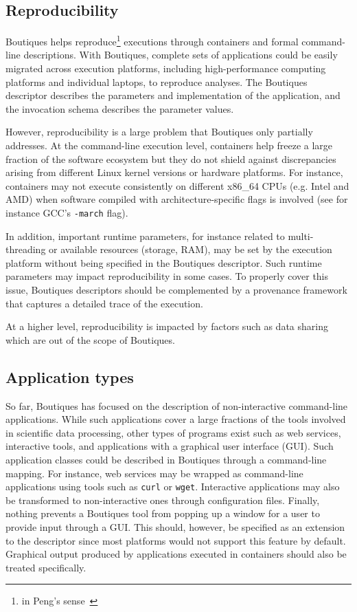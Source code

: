 \documentclass{article}
\newcommand{\boutiques}{Boutiques\xspace}
\begin{document}
\subsection{Reproducibility}

\boutiques helps reproduce\footnote{in Peng's
  sense~\cite{peng2011reproducible}} executions through containers and
formal command-line descriptions. With \boutiques, complete sets of
applications could be easily migrated across execution platforms,
including high-performance computing platforms and individual laptops,
to reproduce analyses. The \boutiques descriptor describes the
parameters and implementation of the application, and the invocation
schema describes the parameter values.

However, reproducibility is a large problem that \boutiques only
partially addresses. At the command-line execution level, containers
help freeze a large fraction of the software ecosystem but they do not
shield against discrepancies arising from different Linux kernel
versions or hardware platforms. For instance, containers may not
execute consistently on different x86\_64 CPUs (e.g. Intel and AMD)
when software compiled with architecture-specific flags is involved
(see for instance GCC's \texttt{-march} flag).

In addition, important runtime parameters, for instance related to
multi-threading or available resources (storage, RAM), may be set by
the execution platform without being specified in the \boutiques
descriptor. Such runtime parameters may impact reproducibility in some
cases. To properly cover this issue, \boutiques descriptors should be
complemented by a provenance framework that captures a detailed trace
of the execution.

At a higher level, reproducibility is impacted by factors
such as data sharing~\cite{poldrack2014making} which are out of the
scope of \boutiques.

\subsection{Application types}

So far, \boutiques has focused on the description of non-interactive
command-line applications. While such applications cover a large
fractions of the tools involved in scientific data processing, other
types of programs exist such as web services, interactive tools, and
applications with a graphical user interface (GUI).  Such application
classes could be described in \boutiques through a command-line
mapping. For instance, web services may be wrapped as command-line
applications using tools such as \texttt{curl} or
\texttt{wget}. Interactive applications may also be transformed to
non-interactive ones through configuration files. Finally, nothing
prevents a \boutiques tool from popping up a window for a user to
provide input through a GUI. This should, however, be specified
as an extension to the descriptor since most platforms would not support
this feature by default. Graphical output produced by applications
executed in containers should also be treated specifically.
\end{document}
